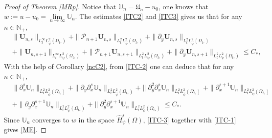 \documentclass{amsart}
\numberwithin{equation}{section}
\begin{document}
\begin{proof}[Proof of Theorem \ref{MRp}]
Notice that $\mathbb{U}_{n}=\mathfrak{U}_{n}-u_{0}$, one knows that $w:=u-u_{0}=\lim\limits_{n\to\infty}\mathbb{U}_{n}$.
The estimates \eqref{ITC2} and \eqref{ITC3} gives us that for any $n\in\mathbb{N}_{+}$,
\begin{align}\label{ITC-2}
& \|\mathbf{U}_{n,s}\|_{L_{t}^{\infty}L_{\hat{\psi}}^{2}(\Omega_{t_{*}})}
 +\|\mathcal{P}_{n+1}\mathbf{U}_{n,s}\|_{L_{t}^{2}L_{\hat{\psi}}^{2}(\Omega_{t_{*}})}
 +\|\partial_{y}\mathbf{U}_{n,s}\|_{L_{t}^{2}L_{\hat{\psi}}^{2}(\Omega_{t_{*}})}\\
&+\|\mathbf{U}_{n,s+1}\|_{L_{t}^{\infty}L_{\check{\psi}}^{2}(\Omega_{t_{*}})}
 +\|\mathcal{P}_{n+1}\mathbf{U}_{n,s+1}\|_{L_{t}^{2}L_{\check{\psi}}^{2}(\Omega_{t_{*}})}
 +\|\partial_{y}\mathbf{U}_{n,s+1}\|_{L_{t}^{2}L_{\check{\psi}}^{2}(\Omega_{t_{*}})}
\leq C_{*},\nonumber
\end{align}
With the help of Corollary \ref{ncC2}, from \eqref{ITC-2} one can deduce that for any $n\in\mathbb{N}_{+}$,
\begin{align}\label{ITC-3}
& \|\partial_{x}^{s}\mathbb{U}_{n}\|_{L_{t}^{2}L_{\hat{\psi}}^{2}(\Omega_{t_{*}})}
 +\|\partial_{y}\partial_{x}^{s}\mathbb{U}_{n}\|_{L_{t}^{2}L_{\hat{\psi}}^{2}(\Omega_{t_{*}})}
 +\|\partial_{y}^{2}\partial_{x}^{s}\mathbb{U}_{n}\|_{L_{t}^{2}L_{\hat{\psi}}^{2}(\Omega_{t_{*}})}
 +\|\partial_{x}^{s+1}\mathbb{U}_{n}\|_{L_{t}^{2}L_{\check{\psi}}^{2}(\Omega_{t_{*}})}\\
&+\|\partial_{y}\partial_{x}^{s+1}\mathbb{U}_{n}\|_{L_{t}^{2}L_{\check{\psi}}^{2}(\Omega_{t_{*}})}
 +\|\partial_{y}^{2}\partial_{x}^{s+1}\mathbb{U}_{n}\|_{L_{t}^{2}L_{\check{\psi}}^{2}(\Omega_{t_{*}})}
\leq C_{*}.\nonumber
\end{align}
Since $\mathbb{U}_{n}$ converges to $w$ in the space $\hat{H}_{\psi}^{s}(\Omega)$, \eqref{ITC-3} together with \eqref{ITC-1} gives \eqref{ME}.

\end{proof}
\end{document}
